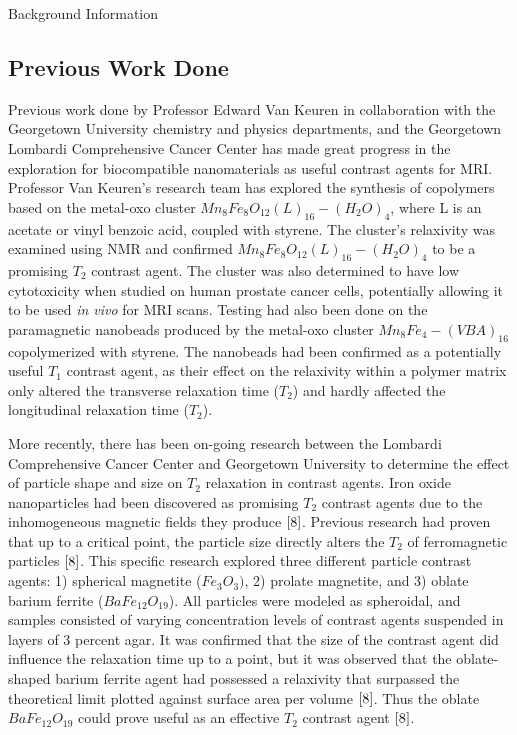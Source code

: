 \documentclass[a4paper,12pt]{article}
\begin{document}
\begin{section}{Background Information}
\subsection{Previous Work Done}
Previous work done by Professor Edward Van Keuren in collaboration with the Georgetown University chemistry and physics departments, and the Georgetown Lombardi Comprehensive Cancer Center has made great progress in the exploration for biocompatible nanomaterials as useful contrast agents for MRI. Professor Van Keuren's research team has explored the synthesis of copolymers based on the metal-oxo cluster $Mn_8 Fe_8 O_{12}(L)_{16}-(H_2 O)_4$, where L is an acetate or vinyl benzoic acid, coupled with styrene\cite[p.~9040]{7}. The cluster's relaxivity was examined using NMR and confirmed $Mn_8 Fe_8 O_{12}(L)_{16}-(H_2 O)_4$ to be a promising $T_2$ contrast agent. The cluster was also determined to have low cytotoxicity when studied on human prostate cancer cells, potentially allowing it to be used {\em in vivo} for MRI scans\cite[p.~9040]{7}. Testing had also been done on the paramagnetic nanobeads produced by the metal-oxo cluster $Mn_8 Fe_4 - (VBA)_{16}$ copolymerized with styrene. The nanobeads had been confirmed as a potentially useful $T_1$ contrast agent, as their effect on the relaxivity within a polymer matrix only altered the transverse relaxation time ($T_2$) and hardly affected the longitudinal relaxation time ($T_2$)\cite{7}.

More recently, there has been on-going research between the Lombardi Comprehensive Cancer Center and Georgetown University to determine the effect of particle shape and size on $T_2$ relaxation in contrast agents. Iron oxide nanoparticles had been discovered as promising $T_2$ contrast agents due to the inhomogeneous magnetic fields they produce $\cite{8}$. Previous research had proven that up to a critical point, the particle size directly alters the $T_2$ of ferromagnetic particles $\cite{8}$. This specific research explored three different particle contrast agents: 1) spherical magnetite ($Fe_3 O_3)$, 2) prolate magnetite, and 3) oblate barium ferrite ($BaFe_{12}O_{19}$). All particles were modeled as spheroidal, and samples consisted of varying concentration levels of contrast agents suspended in layers of 3 percent agar. It was confirmed that the size of the contrast agent did influence the relaxation time up to a point, but it was observed that the oblate-shaped barium ferrite agent had possessed a relaxivity that surpassed the theoretical limit plotted against surface area per volume $\cite{8}$. Thus the oblate $BaFe_{12}O_{19}$ could prove useful as an effective $T_2$ contrast agent $\cite{8}$.


\end{section}
\end{document}

